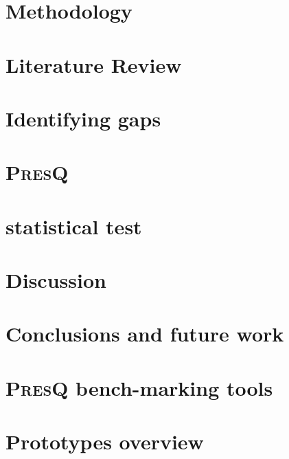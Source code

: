 \documentclass[12pt]{book}
\newcommand{\PresQ}[0]{\textsc{PresQ}\xspace}
\begin{document}
\chapter{Methodology}
\label{chapter:methodology}


\chapter{Literature Review}
\label{chapter:literature_review}


\chapter{Identifying gaps}
\label{chapter:diverse}


\chapter{\PresQ}
\label{chapter:presq}


\chapter{ statistical test}
\label{chapter:som}


\chapter{Discussion}
\label{chapter:discussion}


\chapter{Conclusions and future work}
\label{chapter:conclusions}


\printbibliography[heading=bibintoc]

\appendix
\chapter{\PresQ bench-marking tools}
\label{appendix:presq_benchmarks}


\chapter{Prototypes overview}
\label{appendix:prototypes}

\end{document}
